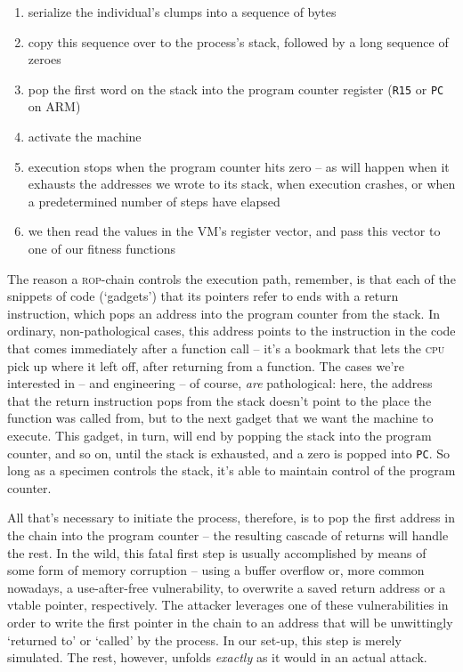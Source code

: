 \begin{enumerate} 
  \item serialize the individual's clumps into a sequence of bytes
  \item copy this sequence over to the process's stack, followed by a long sequence of zeroes
  \item pop the first word on the stack into the program counter register (\texttt{R15} or \texttt{PC} on ARM)
  \item activate the machine
  \item execution stops when the program counter hits zero -- as will happen when it exhausts the addresses we wrote to its stack, when execution crashes, or when a predetermined number of steps have elapsed
  \item we then read the values in the VM's register vector, and pass this vector to one of our fitness functions
\end{enumerate}

The reason a \textsc{rop}-chain controls the execution path,
remember, is that each of the snippets of code (`gadgets') that
its pointers refer to ends with a return instruction, which pops
an address into the program counter from the stack. In ordinary,
non-pathological cases, this address points to the instruction in
the code that comes immediately after a function call -- it's a
bookmark that lets the \textsc{cpu} pick up where it left off,
after returning from a function. The cases we're interested in --
and engineering -- of course, \emph{are} pathological: here, the
address that the return instruction pops from the stack doesn't
point to the place the function was called from, but to the next
gadget that we want the machine to execute. This gadget, in turn,
will end by popping the stack into the program counter, and so
on, until the stack is exhausted, and a zero is popped into
\texttt{PC}. So long as a specimen controls the stack, it's able
to maintain control of the program counter. 


All that's necessary to initiate the process, therefore, is to
pop the first address in the chain into the program counter --
the resulting cascade of returns will handle the rest. In the
wild, this fatal first step is usually accomplished by means of
some form of memory corruption -- using a buffer overflow or,
more common nowadays, a use-after-free vulnerability, to
overwrite a saved return address or a vtable pointer,
respectively.  The attacker leverages one of these
vulnerabilities in order to write the first pointer in the chain
to an address that will be unwittingly `returned to' or `called'
by the process. In our set-up, this step is merely simulated. The
rest, however, unfolds \emph{exactly} as it would in an actual
attack.

